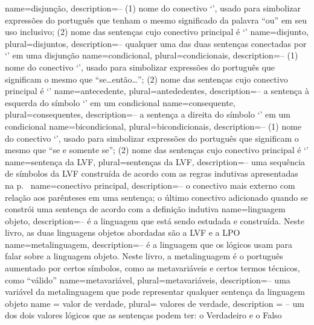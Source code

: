 {
name=disjunção,
description={-- (1) nome do conectivo `\eor', usado para simbolizar expressões do português que tenham o mesmo significado da palavra ``ou'' em seu uso inclusivo; (2) nome das sentenças cujo conectivo principal é `\eor'}
}
{
name=disjunto,
plural=disjuntos,
description={-- qualquer uma das duas sentenças conectadas por `\eor' em uma disjunção}
}
{
name=condicional,
plural=condicionais,
description={-- (1) nome do conectivo `\eif', usado para simbolizar expressões do português que significam o mesmo que ``se\ldots{}então\ldots''; (2) nome das sentenças cujo conectivo principal é `\eif'}
}
{
name=antecedente,
plural=antededentes,
description={-- a sentença à esquerda do símbolo `\eif' em um condicional}
}
{
name=consequente,
plural=consequentes,
description={-- a sentença a direita do símbolo `\eif' em um condicional}
}
{
name=bicondicional,
plural=bicondicionais,
description={-- (1) nome do conectivo `\eiff', usado para simbolizar expressões do português que significam o mesmo que ``se e somente se''; (2) nome das sentenças cujo conectivo principal é `\eiff'}
}
{
name=sentença da LVF,
plural=sentenças da LVF,
description={-- uma sequência de símbolos da LVF construída de acordo com as regras indutivas apresentadas na p.~\pageref{TFLsentences}}
}
{
name=conectivo principal,
description={-- o conectivo mais externo com relação aos parênteses em uma sentença; o último conectivo adicionado quando se constrói uma sentença de acordo com a definição indutiva}
}
{
name=linguagem objeto,
description={-- é a linguagem que está sendo estudada e construída. Neste livro, as duas linguagens objetos abordadas são a LVF e a LPO}
}
{
name=metalinguagem,
description={-- é a linguagem que os lógicos usam para falar sobre a linguagem objeto. Neste livro, a metalinguagem é o português aumentado por certos símbolos, como as metavariáveis e certos termos técnicos, como ``válido''}
}
{
name=metavariável,
plural=metavariáveis,
description={-- uma variável da metalinguagem que pode representar qualquer sentença da linguagem objeto}
}
{
name = valor de verdade,
plural= valores de verdade,
description = {-- um dos dois valores lógicos que as sentenças podem ter: o Verdadeiro e o Falso}
}
